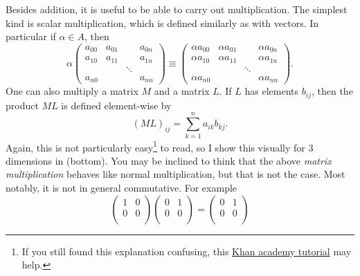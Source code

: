 Besides addition, it is useful to be able to carry out multiplication.
The simplest kind is scalar multiplication,
which is defined similarly as with vectors. In particular if $\alpha\in A$,
then
\begin{equation}
  \alpha\left(\begin{array}{cccc}
          a_{00}   & a_{01} &       & a_{0n}\\ 
          a_{10}   & a_{11} &       & a_{1n}\\
                   &        &\ddots & \\
          a_{n0}   &        &       & a_{nn} 
  \end{array}\right)\equiv
  \left(\begin{array}{cccc}
          \alpha a_{00}   & \alpha a_{01} &       & \alpha a_{0n}\\ 
          \alpha a_{10}   & \alpha a_{11} &       & \alpha a_{1n}\\
                          &               &\ddots &  \\
          \alpha a_{n0}   &               &       & \alpha a_{nn} 
  \end{array}\right).
\end{equation}
One can also multiply a matrix $M$ and a matrix $L$. If $L$ has elements
$b_{ij}$, then the product $ML$ is defined element-wise by
\begin{equation}
  (ML)_{ij}=\sum_{k=1}^n a_{ik}b_{kj}.
\end{equation}
Again, this is not particularly easy\footnote{If you still found this explanation confusing, 
this \href{https://youtu.be/kT4Mp9EdVqs}{Khan academy tutorial}
may help.}
to read, so I show this visually for 3 dimensions in
 (bottom). 
You may be inclined to think that the above 
{\it matrix multiplication} behaves like normal
multiplication, but that is not the case. Most notably, it is not 
in general commutative.
For example
\begin{equation}
  \left(\begin{array}{cc}
          1   & 0\\ 
          0   & 0\\ 
            \end{array}\right)
  \left(\begin{array}{cc}
          0   & 1\\ 
          0   & 0\\ 
            \end{array}\right)
  =\left(\begin{array}{cc}
          0   & 1\\ 
          0   & 0\\ 
            \end{array}\right)
\end{equation}

